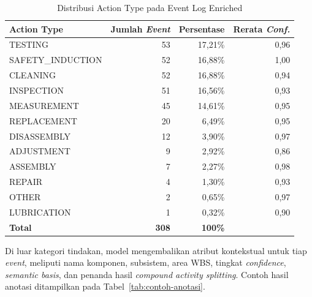 \begin{table}[H]
\centering
\caption{Distribusi Action Type pada Event Log Enriched}
\label{tab:distribusi-action-type}
\footnotesize
\setlength{\tabcolsep}{5pt}
\renewcommand{\arraystretch}{1.05}
\begin{tabular}{@{}l r r r@{}}
\toprule
\textbf{Action Type} & \textbf{Jumlah \textit{Event}} & \textbf{Persentase} & \textbf{Rerata \textit{Conf.}} \\
\midrule
TESTING & 53 & 17,21\% & 0,96 \\
SAFETY\_INDUCTION & 52 & 16,88\% & 1,00 \\
CLEANING & 52 & 16,88\% & 0,94 \\
INSPECTION & 51 & 16,56\% & 0,93 \\
MEASUREMENT & 45 & 14,61\% & 0,95 \\
REPLACEMENT & 20 & 6,49\% & 0,95 \\
DISASSEMBLY & 12 & 3,90\% & 0,97 \\
ADJUSTMENT & 9 & 2,92\% & 0,86 \\
ASSEMBLY & 7 & 2,27\% & 0,98 \\
REPAIR & 4 & 1,30\% & 0,93 \\
OTHER & 2 & 0,65\% & 0,97 \\
LUBRICATION & 1 & 0,32\% & 0,90 \\
\midrule
\textbf{Total} & \textbf{308} & \textbf{100\%} & \\
\bottomrule
\end{tabular}
\end{table}

Di luar kategori tindakan, model mengembalikan atribut kontekstual untuk tiap \textit{event}, meliputi nama komponen, subsistem, area WBS, tingkat \textit{confidence}, \textit{semantic basis}, dan penanda hasil \textit{compound activity splitting}. Contoh hasil anotasi ditampilkan pada Tabel~\ref{tab:contoh-anotasi}.


